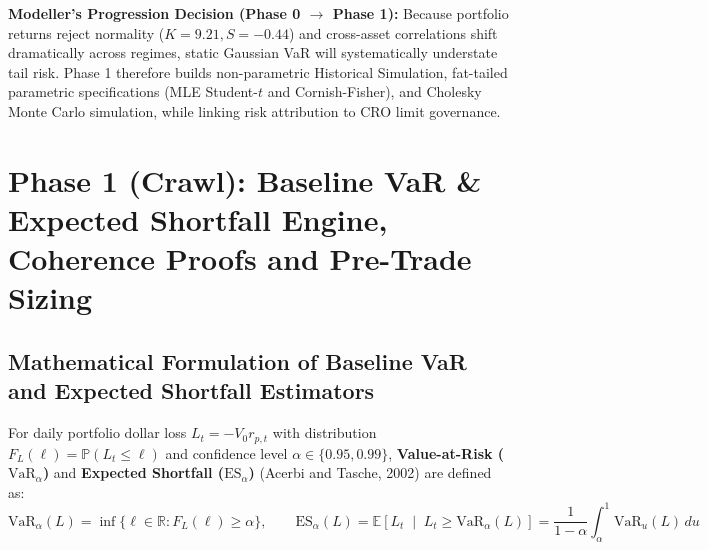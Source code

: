 \documentclass[11pt,a4paper]{article}
\begin{document}
\noindent\textbf{Modeller's Progression Decision (Phase 0 $\rightarrow$ Phase 1):} Because portfolio returns reject normality ($K = 9.21, S = -0.44$) and cross-asset correlations shift dramatically across regimes, static Gaussian VaR will systematically understate tail risk. Phase 1 therefore builds non-parametric Historical Simulation, fat-tailed parametric specifications (MLE Student-$t$ and Cornish-Fisher), and Cholesky Monte Carlo simulation, while linking risk attribution to CRO limit governance.

\section{Phase 1 (Crawl): Baseline VaR \& Expected Shortfall Engine, Coherence Proofs and Pre-Trade Sizing}

\subsection{Mathematical Formulation of Baseline VaR and Expected Shortfall Estimators}

For daily portfolio dollar loss $L_t = -V_0 r_{p,t}$ with distribution $F_L(\ell) = \mathbb{P}(L_t \le \ell)$ and confidence level $\alpha \in \{0.95, 0.99\}$, \textbf{Value-at-Risk ($\text{VaR}_\alpha$)} and \textbf{Expected Shortfall ($\text{ES}_\alpha$)} (Acerbi and Tasche, 2002) are defined as:
\begin{equation}
\text{VaR}_\alpha(L) = \inf\{\ell \in \mathbb{R} : F_L(\ell) \ge \alpha\}, \qquad \text{ES}_\alpha(L) = \mathbb{E}\left[L_t \;\middle|\; L_t \ge \text{VaR}_\alpha(L)\right] = \frac{1}{1-\alpha}\int_{\alpha}^{1} \text{VaR}_u(L)\,du
\end{equation}
\end{document}
